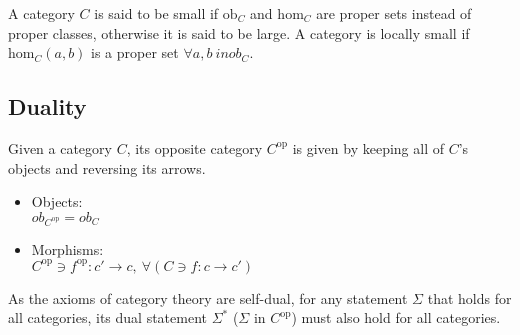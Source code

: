 \noindent A category $C$ is said to be small if $\mathrm{ob}_C$ and
$\mathrm{hom}_C$ are proper sets instead of proper classes, otherwise it is said
to be large. A category is locally small if $\mathrm{hom}_C(a, b)$ is a proper
set $\forall a, b\ in ob_C$. \parencite{awodey:category_theory}

\subsection{Duality}
Given a category $C$, its opposite category $C^\mathrm{op}$ is given by keeping
all of $C$'s objects and reversing its arrows.
\parencite{maclane:working_mathematician}
\begin{itemize}
  \item Objects:\\
    $ob_{C^\mathrm{op}} = ob_C$
  \item Morphisms:\\
    $C^{\mathrm{op}} \ni f^{\mathrm{op}} : c' \to c,
      \ \forall (C \ni f : c \to c')$
\end{itemize}
As the axioms of category theory are self-dual, for any statement $\Sigma$
that holds for all categories, its dual statement $\Sigma^*$ ($\Sigma$ in
$C^\mathrm{op}$) must also hold for all categories.
\parencite{awodey:category_theory}

